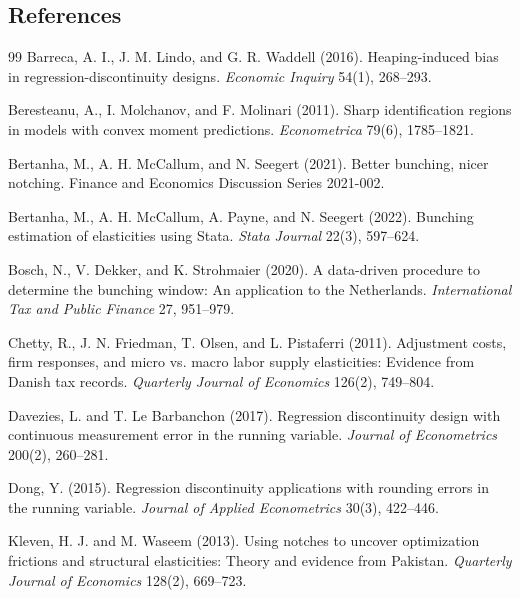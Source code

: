 \documentclass[11pt]{article}
\theoremstyle{definition}
\theoremstyle{plain}
\theoremstyle{remark}
\begin{document}
\subsection*{References}
\begin{thebibliography}{99}
Barreca, A. I., J. M. Lindo, and G. R. Waddell (2016).
Heaping-induced bias in regression-discontinuity designs.
\emph{Economic Inquiry} 54(1), 268--293.

Beresteanu, A., I. Molchanov, and F. Molinari (2011).
Sharp identification regions in models with convex moment predictions.
\emph{Econometrica} 79(6), 1785--1821.

Bertanha, M., A. H. McCallum, and N. Seegert (2021).
Better bunching, nicer notching.
Finance and Economics Discussion Series 2021-002.

Bertanha, M., A. H. McCallum, A. Payne, and N. Seegert (2022).
Bunching estimation of elasticities using Stata.
\emph{Stata Journal} 22(3), 597--624.

Bosch, N., V. Dekker, and K. Strohmaier (2020).
A data-driven procedure to determine the bunching window: An application to the Netherlands.
\emph{International Tax and Public Finance} 27, 951--979.

Chetty, R., J. N. Friedman, T. Olsen, and L. Pistaferri (2011).
Adjustment costs, firm responses, and micro vs. macro labor supply elasticities: Evidence from Danish tax records.
\emph{Quarterly Journal of Economics} 126(2), 749--804.

Davezies, L. and T. Le Barbanchon (2017).
Regression discontinuity design with continuous measurement error in the running variable.
\emph{Journal of Econometrics} 200(2), 260--281.

Dong, Y. (2015).
Regression discontinuity applications with rounding errors in the running variable.
\emph{Journal of Applied Econometrics} 30(3), 422--446.

Kleven, H. J. and M. Waseem (2013).
Using notches to uncover optimization frictions and structural elasticities: Theory and evidence from Pakistan.
\emph{Quarterly Journal of Economics} 128(2), 669--723.


\end{thebibliography}
\end{document}
